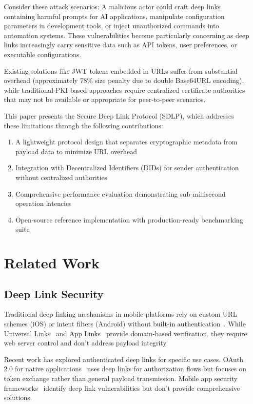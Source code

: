 \documentclass[conference]{IEEEtran}
\begin{document}
Consider these attack scenarios: A malicious actor could craft deep links containing harmful prompts for AI applications, manipulate configuration parameters in development tools, or inject unauthorized commands into automation systems. These vulnerabilities become particularly concerning as deep links increasingly carry sensitive data such as API tokens, user preferences, or executable configurations.

Existing solutions like JWT tokens embedded in URLs suffer from substantial overhead (approximately 78\% size penalty due to double Base64URL encoding), while traditional PKI-based approaches require centralized certificate authorities that may not be available or appropriate for peer-to-peer scenarios.

This paper presents the Secure Deep Link Protocol (SDLP), which addresses these limitations through the following contributions:

\begin{enumerate}
    \item A lightweight protocol design that separates cryptographic metadata from payload data to minimize URL overhead
    \item Integration with Decentralized Identifiers (DIDs) for sender authentication without centralized authorities
    \item Comprehensive performance evaluation demonstrating sub-millisecond operation latencies
    \item Open-source reference implementation with production-ready benchmarking suite
\end{enumerate}

\section{Related Work}

\subsection{Deep Link Security}

Traditional deep linking mechanisms in mobile platforms rely on custom URL schemes (iOS) or intent filters (Android) without built-in authentication~\cite{android-intents, ios-url-schemes}. While Universal Links~\cite{ios-universal-links} and App Links~\cite{android-app-links} provide domain-based verification, they require web server control and don't address payload integrity.

Recent work has explored authenticated deep links for specific use cases. OAuth 2.0 for native applications~\cite{rfc8252} uses deep links for authorization flows but focuses on token exchange rather than general payload transmission. Mobile app security frameworks~\cite{mobile-app-security} identify deep link vulnerabilities but don't provide comprehensive solutions.
\end{document}
